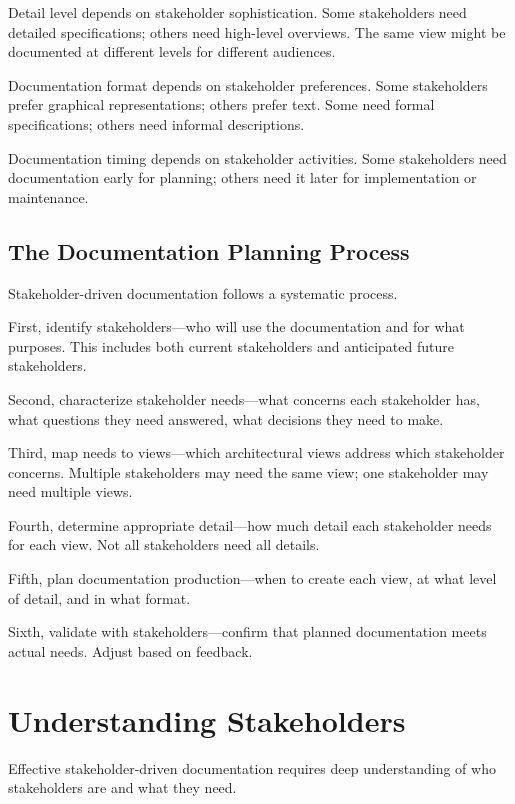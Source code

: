 \documentclass[11pt]{article}
\begin{document}
Detail level depends on stakeholder sophistication. Some stakeholders need detailed specifications; others need high-level overviews. The same view might be documented at different levels for different audiences.

Documentation format depends on stakeholder preferences. Some stakeholders prefer graphical representations; others prefer text. Some need formal specifications; others need informal descriptions.

Documentation timing depends on stakeholder activities. Some stakeholders need documentation early for planning; others need it later for implementation or maintenance.

\subsection{The Documentation Planning Process}

Stakeholder-driven documentation follows a systematic process.

First, identify stakeholders---who will use the documentation and for what purposes. This includes both current stakeholders and anticipated future stakeholders.

Second, characterize stakeholder needs---what concerns each stakeholder has, what questions they need answered, what decisions they need to make.

Third, map needs to views---which architectural views address which stakeholder concerns. Multiple stakeholders may need the same view; one stakeholder may need multiple views.

Fourth, determine appropriate detail---how much detail each stakeholder needs for each view. Not all stakeholders need all details.

Fifth, plan documentation production---when to create each view, at what level of detail, and in what format.

Sixth, validate with stakeholders---confirm that planned documentation meets actual needs. Adjust based on feedback.

\section{Understanding Stakeholders}

Effective stakeholder-driven documentation requires deep understanding of who stakeholders are and what they need.
\end{document}
